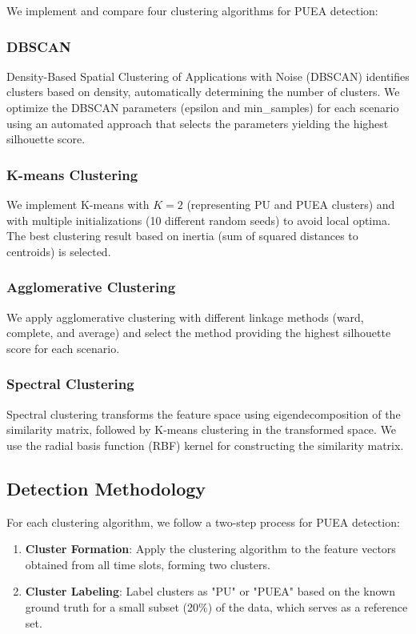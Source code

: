 \documentclass[conference]{IEEEtran}
\begin{document}
We implement and compare four clustering algorithms for PUEA detection:

\subsubsection{DBSCAN}
Density-Based Spatial Clustering of Applications with Noise (DBSCAN) identifies clusters based on density, automatically determining the number of clusters. We optimize the DBSCAN parameters (epsilon and min\_samples) for each scenario using an automated approach that selects the parameters yielding the highest silhouette score.

\subsubsection{K-means Clustering}
We implement K-means with $K=2$ (representing PU and PUEA clusters) and with multiple initializations (10 different random seeds) to avoid local optima. The best clustering result based on inertia (sum of squared distances to centroids) is selected.

\subsubsection{Agglomerative Clustering}
We apply agglomerative clustering with different linkage methods (ward, complete, and average) and select the method providing the highest silhouette score for each scenario.

\subsubsection{Spectral Clustering}
Spectral clustering transforms the feature space using eigendecomposition of the similarity matrix, followed by K-means clustering in the transformed space. We use the radial basis function (RBF) kernel for constructing the similarity matrix.

\subsection{Detection Methodology}

For each clustering algorithm, we follow a two-step process for PUEA detection:

\begin{enumerate}
    \item \textbf{Cluster Formation}: Apply the clustering algorithm to the feature vectors obtained from all time slots, forming two clusters.
    \item \textbf{Cluster Labeling}: Label clusters as "PU" or "PUEA" based on the known ground truth for a small subset (20\%) of the data, which serves as a reference set.
\end{enumerate}
\end{document}
